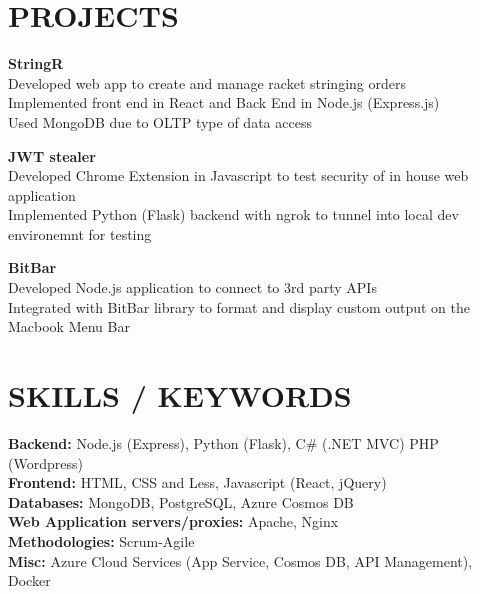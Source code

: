\documentclass[margin,line]{resume}
\begin{document}
\begin{resume}
\sectionline


\section{\mysidestyle \textbf{\large{P}\small{ROJECTS}}}

    \textbf{\listing StringR} \vspace{2mm}\\\vspace{1mm}%
    Developed web app to create and manage racket stringing orders\\
    Implemented front end in React and Back End in Node.js (Express.js)\\
    Used MongoDB due to OLTP type of data access
    

    \textbf{\listing JWT stealer} \vspace{2mm}\\\vspace{1mm}%
    Developed Chrome Extension in Javascript to test security of in house web application\\
    Implemented Python (Flask) backend with ngrok to tunnel into local dev environemnt for testing

    \textbf{\listing BitBar} \vspace{2mm}\\\vspace{1mm}%
    Developed Node.js application to connect to 3rd party APIs\\
    Integrated with BitBar library to format and display custom output on the Macbook Menu Bar

\sectionline
    \section{\mysidestyle \textbf{\large{S}\small{KILLS} / \large{K}\small{EYWORDS}}}

    \textbf{Backend:} Node.js (Express), Python (Flask), C\# (.NET MVC) PHP (Wordpress)\\
    \textbf{Frontend:} HTML, CSS and Less, Javascript (React, jQuery)\\
    \textbf{Databases:} MongoDB, PostgreSQL, Azure Cosmos DB\\
    \textbf{Web Application servers/proxies:} Apache, Nginx\\
    \textbf{Methodologies:} Scrum-Agile\\
    \textbf{Misc:} Azure Cloud Services (App Service, Cosmos DB, API Management), Docker\\


\end{resume}
\end{document}
